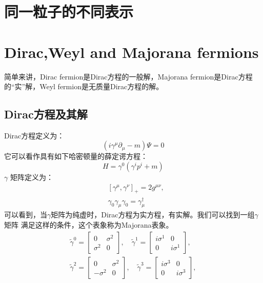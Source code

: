 \documentclass[12pt, a4paper, oneside]{ctexbook}
\def\gm{$ \gamma $矩阵 }
\begin{document}
    \section{同一粒子的不同表示}
	\section{Dirac,Weyl and Majorana fermions}\cite{pal2011dirac}
	简单来讲，Dirac fermion是Dirac方程的一般解，Majorana fermion是Dirac方程的“实”解，Weyl fermion是无质量Dirac方程的解。\\
	\subsection{Dirac方程及其解}
	Dirac方程定义为：
	\begin{equation}
		\left(i \gamma^\mu \partial_\mu-m\right) \Psi=0\label{de}
	\end{equation}
	它可以看作具有如下哈密顿量的薛定谔方程：
	\begin{equation}
		H=\gamma^0\left(\gamma^i p^i+m\right)
	\end{equation}
	$\gamma$ 矩阵定义为：
	\begin{equation}
		\begin{aligned}
			& {\left[\gamma^\mu, \gamma^\nu\right]_{+}=2 g^{\mu \nu},} \\
			& \gamma_0 \gamma_\mu \gamma_0=\gamma_\mu^{\dagger}
			\end{aligned}
	\end{equation}
	可以看到，当$ \gamma $矩阵为纯虚时，Dirac方程为实方程，有实解。我们可以找到一组\gm 满足这样的条件，这个表象称为Majorana表象。
	\begin{equation}
		\begin{array}{ll}
			\widetilde{\gamma}^0=\left[\begin{array}{cc}
			0 & \sigma^2 \\
			\sigma^2 & 0
			\end{array}\right], \quad \widetilde{\gamma}^1=\left[\begin{array}{cc}
			i \sigma^1 & 0 \\
			0 & i \sigma^1
			\end{array}\right], \\
			\tilde{\gamma}^2=\left[\begin{array}{cc}
			0 & \sigma^2 \\
			-\sigma^2 & 0
			\end{array}\right], \quad \tilde{\gamma}^3=\left[\begin{array}{cc}
			i \sigma^3 & 0 \\
			0 & i \sigma^3
			\end{array}\right],
			\end{array}
	\end{equation}
\end{document}

